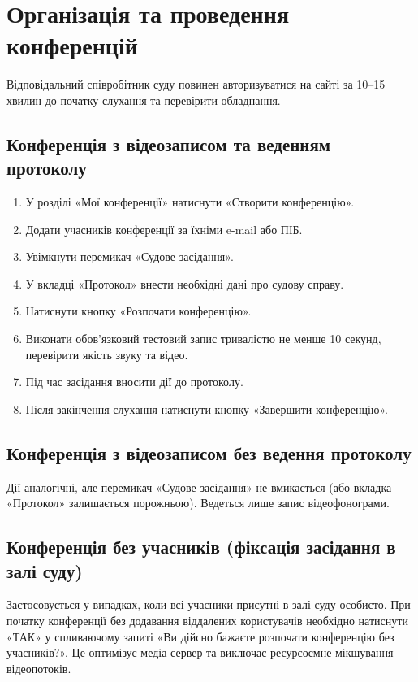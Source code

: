 \documentclass{article}
\begin{document}
\newpage

\section{Організація та проведення конференцій}

Відповідальний співробітник суду повинен авторизуватися на сайті за 10--15 хвилин до початку слухання та перевірити обладнання.

\subsection{Конференція з відеозаписом та веденням протоколу}
\begin{enumerate}
    \item У розділі «Мої конференції» натиснути «Створити конференцію».
    \item Додати учасників конференції за їхніми e-mail або ПІБ.
    \item Увімкнути перемикач «Судове засідання».
    \item У вкладці «Протокол» внести необхідні дані про судову справу.
    \item Натиснути кнопку «Розпочати конференцію».
    \item Виконати обов'язковий тестовий запис тривалістю не менше 10 секунд, перевірити якість звуку та відео.
    \item Під час засідання вносити дії до протоколу.
    \item Після закінчення слухання натиснути кнопку «Завершити конференцію».
\end{enumerate}

\subsection{Конференція з відеозаписом без ведення протоколу}
Дії аналогічні, але перемикач «Судове засідання» не вмикається (або вкладка «Протокол» залишається порожньою). Ведеться лише запис відеофонограми.

\subsection{Конференція без учасників (фіксація засідання в залі суду)}
Застосовується у випадках, коли всі учасники присутні в залі суду особисто. При початку конференції без додавання віддалених користувачів необхідно натиснути «ТАК» у спливаючому запиті «Ви дійсно бажаєте розпочати конференцію без учасників?». Це оптимізує медіа-сервер та виключає ресурсоємне мікшування відеопотоків.
\end{document}
